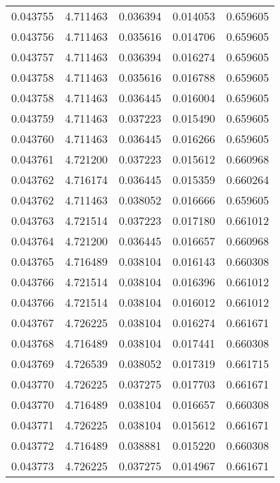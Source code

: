 \begin{tabular}{lrrrr}
0.043755    &  4.711463 &  0.036394 &  0.014053 &             0.659605 \\
0.043756    &  4.711463 &  0.035616 &  0.014706 &             0.659605 \\
0.043757    &  4.711463 &  0.036394 &  0.016274 &             0.659605 \\
0.043758    &  4.711463 &  0.035616 &  0.016788 &             0.659605 \\
0.043758    &  4.711463 &  0.036445 &  0.016004 &             0.659605 \\
0.043759    &  4.711463 &  0.037223 &  0.015490 &             0.659605 \\
0.043760    &  4.711463 &  0.036445 &  0.016266 &             0.659605 \\
0.043761    &  4.721200 &  0.037223 &  0.015612 &             0.660968 \\
0.043762    &  4.716174 &  0.036445 &  0.015359 &             0.660264 \\
0.043762    &  4.711463 &  0.038052 &  0.016666 &             0.659605 \\
0.043763    &  4.721514 &  0.037223 &  0.017180 &             0.661012 \\
0.043764    &  4.721200 &  0.036445 &  0.016657 &             0.660968 \\
0.043765    &  4.716489 &  0.038104 &  0.016143 &             0.660308 \\
0.043766    &  4.721514 &  0.038104 &  0.016396 &             0.661012 \\
0.043766    &  4.721514 &  0.038104 &  0.016012 &             0.661012 \\
0.043767    &  4.726225 &  0.038104 &  0.016274 &             0.661671 \\
0.043768    &  4.716489 &  0.038104 &  0.017441 &             0.660308 \\
0.043769    &  4.726539 &  0.038052 &  0.017319 &             0.661715 \\
0.043770    &  4.726225 &  0.037275 &  0.017703 &             0.661671 \\
0.043770    &  4.716489 &  0.038104 &  0.016657 &             0.660308 \\
0.043771    &  4.726225 &  0.038104 &  0.015612 &             0.661671 \\
0.043772    &  4.716489 &  0.038881 &  0.015220 &             0.660308 \\
0.043773    &  4.726225 &  0.037275 &  0.014967 &             0.661671 \\

\end{tabular}
